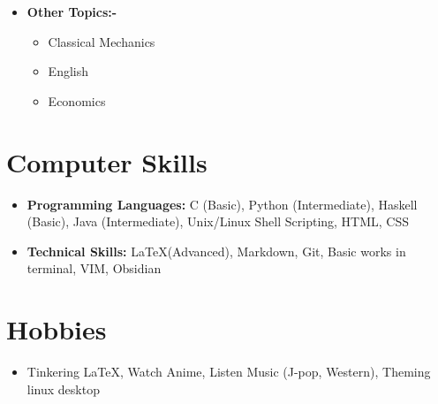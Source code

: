\documentclass[10pt,a4paper,sans,colorlinks]{moderncv}        %
\begin{document}
\begin{itemize}
\begin{itemize}
	      \end{itemize}
	      \vspace*{5mm}
	\item \textbf{Other Topics:-}
	      \begin{itemize}
		      \item Classical Mechanics
		      \item English
		      \item Economics
	      \end{itemize}


\end{itemize}



\section{Computer Skills}

\begin{itemize}

	\item \textbf{Programming Languages:} C (Basic), Python (Intermediate), Haskell (Basic), Java (Intermediate), Unix/Linux Shell Scripting, HTML, CSS

	\item \textbf{Technical Skills:} \LaTeX (Advanced), Markdown, Git, Basic works in terminal, VIM, Obsidian


\end{itemize}
\section{Hobbies}

\begin{itemize}

	\item  Tinkering \LaTeX, Watch Anime, Listen Music (J-pop, Western), Theming linux desktop


\end{itemize}
%	


\end{document}
